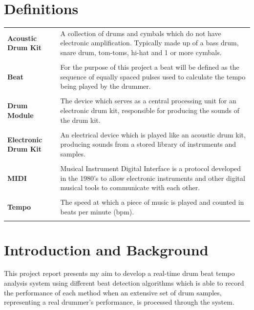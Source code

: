 \documentclass[a4paper, 11pt]{article}
\begin{document}
\section*{Definitions}
\begin{tabular}{l p{4.5in}}\\
\textbf{Acoustic Drum Kit} & A collection of drums and cymbals which do not have electronic amplification. Typically made up of a bass drum, snare drum, tom-toms, hi-hat and 1 or more cymbals.\\\\
\textbf{Beat} & For the purpose of this project a beat will be defined as the sequence of equally spaced pulses used to calculate the tempo being played by the drummer.\\\\
\textbf{Drum Module} & The device which serves as a central processing unit for an electronic drum kit, responsible for producing the sounds of the drum kit.\\\\
\textbf{Electronic Drum Kit} & An electrical device which is played like an acoustic drum kit, producing sounds from a stored library of instruments and samples.\\\\
\textbf{MIDI} & Musical Instrument Digital Interface is a protocol developed in the 1980's to allow electronic instruments and other digital musical tools to communicate with each other\cite{midi}.\\\\
\textbf{Tempo} & The speed at which a piece of music is played \cite{oxford-comp} and counted in beats per minute (bpm).\\\\
\end{tabular}
\clearpage

\maketitle{} \section{Introduction and Background}

This project report presents my aim to develop a real-time drum beat tempo analysis system using different beat detection algorithms which is able to record the performance of each method when an extensive set of drum samples, representing a real drummer's performance, is processed through the system.
\end{document}

